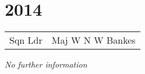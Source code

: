 \chapter*{2014}

\begin{center}
  \small
  \begin{tabular}{rl}
    Sqn Ldr & Maj W N W Bankes \\
  \end{tabular}
\end{center}

\begin{center}
  \textit{No further information}
\end{center}

\vspace{50mm}

\pagebreak

